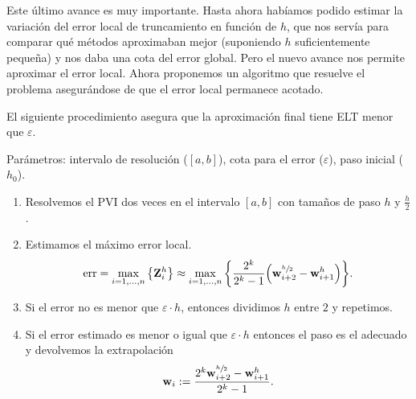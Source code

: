 
Este último avance es muy importante.
Hasta ahora habíamos podido estimar
la variación del error local de truncamiento en función de $h$,
que nos servía para comparar qué métodos aproximaban mejor
(suponiendo $h$ suficientemente pequeña)
y nos daba una cota del error global.
Pero el nuevo avance nos permite aproximar el error local.
Ahora proponemos un algoritmo que resuelve el problema
asegurándose de que el error local permanece acotado.

\begin{theorem}
    El siguiente procedimiento asegura que la aproximación final
    tiene ELT menor que $\varepsilon$.

    Parámetros:
    intervalo de resolución (\/$[a, b]$),
    cota para el error (\/$\varepsilon$),
    paso inicial (\/$h_0$).

    \begin{enumerate}
        \item Resolvemos el PVI dos veces en el intervalo $[a, b]$
        con tamaños de paso $h$ y $\frac{h}{2}$.
        \item Estimamos el máximo error local.
        \begin{equation*}
            \operatorname{err} = \max_{i = 1,\ldots,n}\qty{\vb{Z}^h_i} \approx
            \max_{i = 1,\ldots,n}\qty{
                \frac{2^k}{2^k-1}\qty(\vb{w}^{\sfrac{h}{2}}_{i+2} - \vb{w}^h_{i+1})
            }.
        \end{equation*}
        \item Si el error no es menor que $\varepsilon\cdot h$,
        entonces dividimos $h$ entre $2$ y repetimos.
        \item Si el error estimado es menor o igual que $\varepsilon \cdot h$
        entonces el paso es el adecuado y
        devolvemos la extrapolación
        \begin{equation*}
            \vb{w}_i := \frac{2^k\vb{w}^{\sfrac{h}{2}}_{i+2} - \vb{w}^h_{i+1}}{2^k - 1}.
        \end{equation*}
    \end{enumerate}
\end{theorem}

